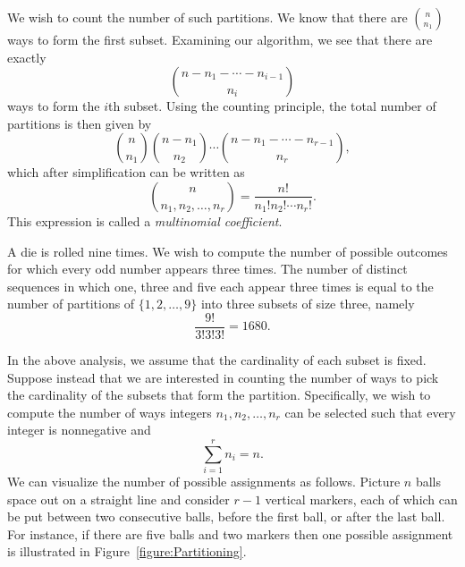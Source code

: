 We wish to count the number of such partitions.
We know that there are $\binom{n}{n_1}$ ways to form the first subset.
Examining our algorithm, we see that there are exactly
\begin{equation*}
\binom{n - n_1 - \cdots - n_{i-1}}{n_i}
\end{equation*}
ways to form the $i$th subset.
Using the counting principle, the total number of partitions is then given by
\begin{equation*}
\binom{n}{n_1} \binom{n - n_1}{n_2}
\cdots \binom{n - n_1 - \cdots - n_{r-1}}{n_r},
\end{equation*}
which after simplification can be written as
\begin{equation*}
\binom{n}{n_1, n_2, \ldots, n_r}
= \frac{n!}{n_1! n_2! \cdots n_r!} .
\end{equation*}
This expression is called a \emph{multinomial coefficient}. 

\begin{example}
A die is rolled nine times.
We wish to compute the number of possible outcomes for which every odd number appears three times.
The number of distinct sequences in which one, three and five each appear three times is equal to the number of partitions of $\{ 1, 2, \ldots, 9 \}$ into three subsets of size three, namely
\begin{equation*}
\frac{9!}{3! 3! 3!} = 1680 .
\end{equation*}
\end{example}

In the above analysis, we assume that the cardinality of each subset is fixed.
Suppose instead that we are interested in counting the number of ways to pick the cardinality of the subsets that form the partition. 
Specifically, we wish to compute the number of ways integers $n_1, n_2, \ldots, n_r$ can be selected such that every integer is nonnegative and
\begin{equation*}
\sum_{i = 1}^r n_i = n.
\end{equation*}
We can visualize the number of possible assignments as follows.
Picture $n$ balls space out on a straight line and consider $r-1$ vertical markers, each of which can be put between two consecutive balls, before the first ball, or after the last ball. 
For instance, if there are five balls and two markers then one possible assignment is illustrated in Figure~\ref{figure:Partitioning}.

